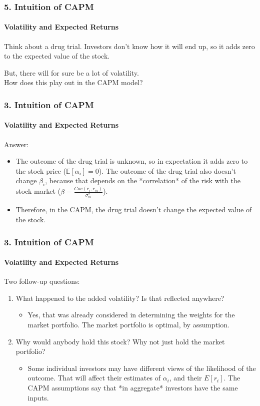 \documentclass{beamer}
\begin{document}
\begin{frame}[t]
    \frametitle{5. Intuition of CAPM}
    \framesubtitle{Volatility and Expected Returns}

    Think about a drug trial.
    Investors don't know how it will end up, so it adds zero to the expected value of the stock. \\
    \vspace{1em}
    
    But, there will for sure be a lot of volatility. \\
    \vspace{1em}
    How does this play out in the CAPM model?\\


\end{frame}

\begin{frame}[t]
    \frametitle{3. Intuition of CAPM}
    \framesubtitle{Volatility and Expected Returns}

    Answer: 
    \begin{itemize}
        \item The outcome of the drug trial is unknown, so in expectation it adds zero to the stock price ($\mathbb{E}[\alpha_i] = 0$).   The outcome of the drug trial also doesn't change $\beta_i$, because that depends on the *correlation* of the risk with the stock market ($\beta = \frac{Cov(r_i,r_m)}{\sigma_m^2}$).   
        \item Therefore, in the CAPM, the drug trial doesn't change the expected value of the stock.
    \end{itemize}

\end{frame}

\begin{frame}[t]
    \frametitle{3. Intuition of CAPM}
    \framesubtitle{Volatility and Expected Returns}

    Two follow-up questions:
    \begin{enumerate}
        \item What happened to the added volatility?  Is that reflected anywhere?   
            \begin{itemize}
                \item Yes, that was already considered in determining the weights for the market portfolio.   The market portfolio is optimal, by assumption.
            \end{itemize}
        \item Why would anybody hold this stock?  Why not just hold the market portfolio?  
            \begin{itemize}
                \item Some individual investors may have different views of the likelihood of the outcome.   That will affect their estimates of $\alpha_i$, and their $E[r_i]$.   The CAPM assumptions say that *in aggregate* investors have the same inputs.
            \end{itemize}
    \end{enumerate}

\end{frame}
\end{document}

